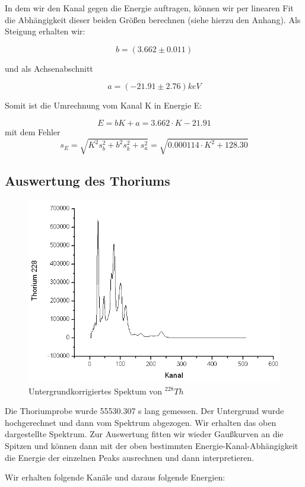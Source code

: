 In dem wir den Kanal gegen die Energie auftragen, können wir per linearen Fit die Abhängigkeit dieser beiden Größen berechnen (siehe hierzu den Anhang). Als Steigung erhalten wir:

$$ b = (3.662 \pm 0.011) $$

und als Achsenabschnitt

$$ a = (-21.91 \pm 2.76) keV $$

Somit ist die Umrechnung vom Kanal K in Energie E:

$$ \boxed{E = bK + a = 3.662\cdot K - 21.91} $$ 
mit dem Fehler
$$ s_E = \sqrt{K^2s_b^2 + b^2s_k^2 + s_a^2} = \sqrt{0.000114\cdot K^2 + 128.30} $$

\subsection{Auswertung des Thoriums}

\begin{figure}[H]
\centering \includegraphics[width = \textwidth]{auswertung/Thoriumganz.png}
\caption{Untergrundkorrigiertes Spektum von $^{228}Th$}
\end{figure}

Die Thoriumprobe wurde 55530.307 s lang gemessen. Der Untergrund wurde hochgerechnet und dann vom Spektrum abgezogen. Wir erhalten das oben dargestellte Spektrum. Zur Auswertung fitten wir wieder Gaußkurven an die Spitzen und können dann mit der oben bestimmten Energie-Kanal-Abhängigkeit die Energie der einzelnen Peaks ausrechnen und dann interpretieren.

Wir erhalten folgende Kanäle und daraus folgende Energien:


